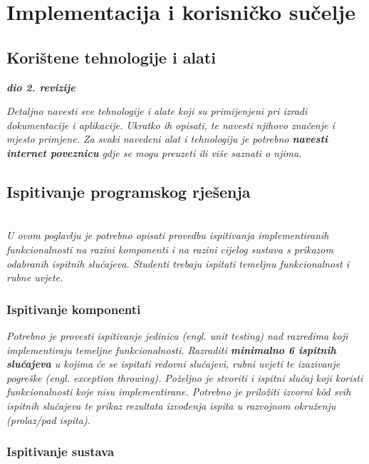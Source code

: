 \chapter{Implementacija i korisničko sučelje}
		
		
		\section{Korištene tehnologije i alati}
		
			\textbf{\textit{dio 2. revizije}}
			
			 \textit{Detaljno navesti sve tehnologije i alate koji su primijenjeni pri izradi dokumentacije i aplikacije. Ukratko ih opisati, te navesti njihovo značenje i mjesto primjene. Za svaki navedeni alat i tehnologiju je potrebno \textbf{navesti internet poveznicu} gdje se mogu preuzeti ili više saznati o njima}.
			
			
			\eject 
		
	
		\section{Ispitivanje programskog rješenja}
			
			\textbf{}\\
			
			 \textit{U ovom poglavlju je potrebno opisati provedbu ispitivanja implementiranih funkcionalnosti na razini komponenti i na razini cijelog sustava s prikazom odabranih ispitnih slučajeva. Studenti trebaju ispitati temeljnu funkcionalnost i rubne uvjete.}
	
			
			\subsection{Ispitivanje komponenti}
			\textit{Potrebno je provesti ispitivanje jedinica (engl. unit testing) nad razredima koji implementiraju temeljne funkcionalnosti. Razraditi \textbf{minimalno 6 ispitnih slučajeva} u kojima će se ispitati redovni slučajevi, rubni uvjeti te izazivanje pogreške (engl. exception throwing). Poželjno je stvoriti i ispitni slučaj koji koristi funkcionalnosti koje nisu implementirane. Potrebno je priložiti izvorni kôd svih ispitnih slučajeva te prikaz rezultata izvođenja ispita u razvojnom okruženju (prolaz/pad ispita). }
			
			
			
			
			\subsection{Ispitivanje sustava}
			

